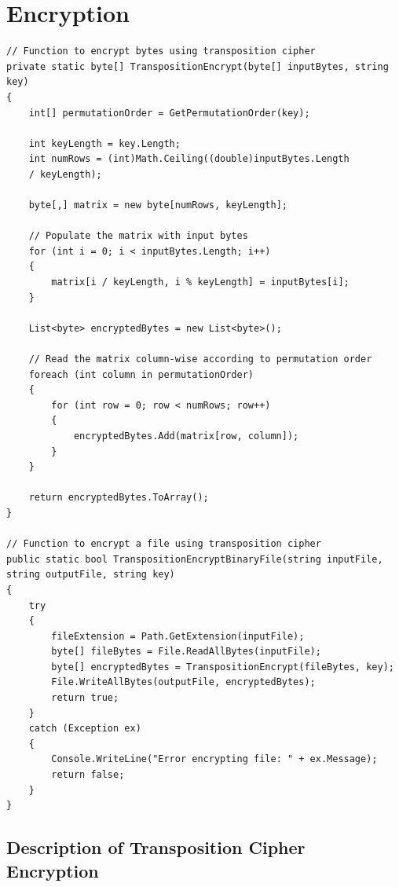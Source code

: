 \documentclass[a4paper,oneside,11pt]{book}
\begin{document}
\section{Encryption}
\begin{lstlisting}[language=Csh, caption={Code for Transposition Cipher Encryption}]
// Function to encrypt bytes using transposition cipher
private static byte[] TranspositionEncrypt(byte[] inputBytes, string key)
{
    int[] permutationOrder = GetPermutationOrder(key);

    int keyLength = key.Length;
    int numRows = (int)Math.Ceiling((double)inputBytes.Length 
    / keyLength);

    byte[,] matrix = new byte[numRows, keyLength];

    // Populate the matrix with input bytes
    for (int i = 0; i < inputBytes.Length; i++)
    {
        matrix[i / keyLength, i % keyLength] = inputBytes[i];
    }

    List<byte> encryptedBytes = new List<byte>();

    // Read the matrix column-wise according to permutation order
    foreach (int column in permutationOrder)
    {
        for (int row = 0; row < numRows; row++)
        {
            encryptedBytes.Add(matrix[row, column]);
        }
    }

    return encryptedBytes.ToArray();
}

// Function to encrypt a file using transposition cipher
public static bool TranspositionEncryptBinaryFile(string inputFile, 
string outputFile, string key)
{
    try
    {
        fileExtension = Path.GetExtension(inputFile);
        byte[] fileBytes = File.ReadAllBytes(inputFile);
        byte[] encryptedBytes = TranspositionEncrypt(fileBytes, key);
        File.WriteAllBytes(outputFile, encryptedBytes);
        return true;
    }
    catch (Exception ex)
    {
        Console.WriteLine("Error encrypting file: " + ex.Message);
        return false;
    }
}
\end{lstlisting}

\subsection{Description of Transposition Cipher Encryption}
\end{document}
